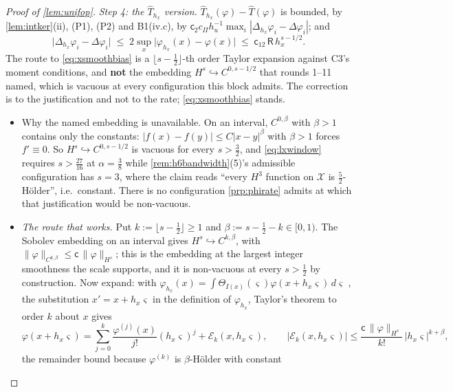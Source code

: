\begin{proof}[Proof of \cref{lem:unifop}]
\emph{Step 4: the $\hat T_{h_x}$ version.} $\hat T_{h_x}(\varphi)-\hat T(\varphi)$ is bounded, by
\cref{lem:intker}(ii), (P1), (P2) and B1(iv.c), by
$\mathsf c_2c_\Pi h_u^{-1}\max_i|\Delta_{h_x}\varphi_i-\Delta\varphi_i|$; and
\begin{equation}\label{eq:xsmoothbias}
\big|\Delta_{h_x}\varphi_i-\Delta\varphi_i\big|\;\le\;2\sup_x\big|\varphi_{h_x}(x)-\varphi(x)\big|
\;\le\;\mathsf c_{12}\,\mathsf R\,h_x^{s-1/2} .
\end{equation}
The route to \eqref{eq:xsmoothbias} is a $\lfloor s-\tfrac12\rfloor$-th order Taylor expansion
against C3's moment conditions, and \textbf{not} the embedding $H^{s}\hookrightarrow C^{0,s-1/2}$ that
rounds 1--11 named, which is vacuous at every configuration this block admits. The correction is to
the justification and not to the rate; \eqref{eq:xsmoothbias} stands.
\begin{itemize}
\item[--] Why the named embedding is unavailable. On an interval, $C^{0,\beta}$ with $\beta>1$
contains only the constants: $|f(x)-f(y)|\le C|x-y|^{\beta}$ with $\beta>1$ forces $f'\equiv0$. So
$H^{s}\hookrightarrow C^{0,s-1/2}$ is vacuous for every $s>\tfrac32$, and \eqref{eq:lxwindow}
requires $s>\tfrac{27}{16}$ at $\alpha=\tfrac38$ while \cref{rem:h6bandwidth}(5)'s admissible
configuration has $s=3$, where the claim reads ``every $H^{3}$ function on $\mathcal X$ is
$\tfrac52$-H\"older'', i.e.\ constant. There is no configuration \cref{prp:phirate} admits at which
that justification would be non-vacuous.
\item[--] \emph{The route that works.} Put $k:=\lfloor s-\tfrac12\rfloor\ge1$ and
$\beta:=s-\tfrac12-k\in[0,1)$. The Sobolev embedding on an interval gives
$H^{s}\hookrightarrow C^{k,\beta}$, with $\|\varphi\|_{C^{k,\beta}}\le\mathsf c\,\|\varphi\|_{H^{s}}$;
this is the embedding at the largest integer smoothness the scale supports, and it is non-vacuous at
every $s>\tfrac12$ by construction. Now expand: with $\varphi_{h_x}(x)=\int\Theta_{I(x)}(\varsigma)\varphi(x+h_x\varsigma)\,d\varsigma$
, the substitution $x'=x+h_x\varsigma$ in the definition of $\varphi_{h_x}$, Taylor's theorem to
order $k$ about $x$ gives
\[
\varphi(x+h_x\varsigma)=\sum_{j=0}^{k}\frac{\varphi^{(j)}(x)}{j!}(h_x\varsigma)^{j}+\mathcal E_k(x,h_x\varsigma),
\qquad
\big|\mathcal E_k(x,h_x\varsigma)\big|\le\frac{\mathsf c\,\|\varphi\|_{H^{s}}}{k!}\,\big|h_x\varsigma\big|^{k+\beta},
\]
the remainder bound because $\varphi^{(k)}$ is $\beta$-H\"older with constant

\end{itemize}
\end{proof}
